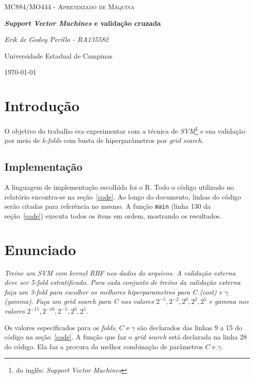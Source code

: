 \documentclass[10pt]{article}
\newcommand{\fromeng}[1]{\footnote{do inglês: \textit{#1}}}
\newcommand{\tit}[1]{\textit{#1}}
\newcommand{\ttt}[1]{\texttt{#1}}
\begin{document}
\begin{titlepage}
	\centering
	{\scshape\Large MC884/MO444 - Aprendizado de Máquina\par}
	\vspace{1.5cm}
	{\huge\bfseries \tit{Support Vector Machines} e validação cruzada\par}
	\vspace{1cm}
	{\itshape Erik de Godoy Perillo - RA135582\par}
	\vfill
	Universidade Estadual de Campinas 
	\vfill
	{\large \today\par}
\end{titlepage}

\newpage

\section{Introdução}
O objetivo do trabalho era experimentar com a técnica de 
\tit{SVM}\fromeng{Support Vector Machines} e sua validação por meio de
\tit{k-folds} com busta de hiperparâmetros por \tit{grid search}.

\subsection{Implementação}
A linguagem de implementação escolhida foi o R.
Todo o código utilizado no relatório encontra-se na seção~\ref{code}.
Ao longo do documento, linhas do código serão citadas para referência no mesmo.
A função \ttt{main} (linha 130 da seção~\ref{code}) executa todos os itens em
ordem, mostrando os resultados.

\section{Enunciado}
\tit{Treine um SVM com kernel RBF nos dados do arquivos.
A validação externa deve ser 5-fold estratificado.
Para cada conjunto de treino da validação externa faça um 3-fold para 
escolher os melhores hiperparametros para C (cost) e $\gamma$ (gamma).
Faça um grid search para C nos valores $2^{-5}, 2^{-2}, 2^0, 2^2, 2^5$ 
e gamma nos valores $2^{-15}, 2^{-10}, 2^{-5}, 2^0, 2^5$.}\newline

Os valores especificados para os \tit{folds}, $C$ e $\gamma$
são declarados das linhas 9 a 15 do código na seção~\ref{code}. 
A função que faz o \tit{grid search} está declarada na linha
28 do código. 
Ela faz a procura da melhor combinação de parâmetros $C$ e $\gamma$.
\end{document}
